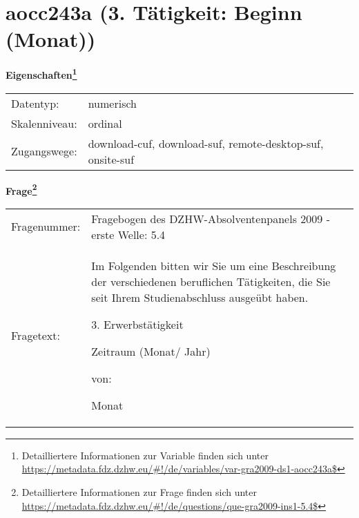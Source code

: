 
    \setcounter{footnote}{0}

    \vspace*{-1.8cm}
	\section{aocc243a (3. Tätigkeit: Beginn (Monat))}
	\label{section:aocc243a}



    \vspace*{0.5cm}
    \noindent\textbf{Eigenschaften\footnote{Detailliertere Informationen zur Variable finden sich unter
		\url{https://metadata.fdz.dzhw.eu/\#!/de/variables/var-gra2009-ds1-aocc243a$}}}\\
	\begin{tabularx}{\hsize}{@{}lX}
	Datentyp: & numerisch \\
	Skalenniveau: & ordinal \\
	Zugangswege: &
	  download-cuf, 
	  download-suf, 
	  remote-desktop-suf, 
	  onsite-suf
 \\
    \end{tabularx}



				\vspace*{0.5cm}
                \noindent\textbf{Frage\footnote{Detailliertere Informationen zur Frage finden sich unter
		              \url{https://metadata.fdz.dzhw.eu/\#!/de/questions/que-gra2009-ins1-5.4$}}}\\
				\begin{tabularx}{\hsize}{@{}lX}
					Fragenummer: &
					  Fragebogen des DZHW-Absolventenpanels 2009 - erste Welle:
					  5.4
 \\
					Fragetext: & Im Folgenden bitten wir Sie um eine Beschreibung der verschiedenen beruflichen Tätigkeiten, die Sie seit Ihrem Studienabschluss ausgeübt haben.\par  3. Erwerbstätigkeit\par  Zeitraum (Monat/ Jahr)\par  von:\par  Monat \\
				\end{tabularx}





